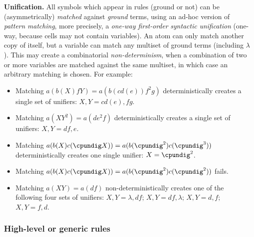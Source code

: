 \medskip
\noindent
\textbf{Unification.} 
All symbols which appear in rules (ground or not) can be (asymmetrically) \emph{matched} against \emph{ground} terms,
using an ad-hoc version of \emph{pattern matching}, 
more precisely, a \emph{one-way first-order syntactic unification} (one-way, because cells may not contain variables).
An atom can only match another copy of itself, but
a variable can match any multiset of ground terms (including $\lambda$).
This may create a combinatorial \emph{non-determinism}, 
when a combination of two or more variables are matched against the same multiset,
in which case an arbitrary matching is chosen. 
For example:
\begin{itemize}
\item Matching $a(b(X)fY) = a(b(cd(e))f^2g)$ deterministically creates a single set of unifiers:
$X, Y = cd(e), fg$.

\smallskip
\item Matching $a(XY^2) = a(de^2f)$ deterministically creates a single set of unifiers: 
$X, Y = df, e$.

\smallskip
\item Matching $a(b(X)c(\cpundig X)) = a(b(\cpundig^2)c(\cpundig^3))$ deterministically creates one single unifier: 
$X = \cpundig^2$.

\smallskip
\item Matching $a(b(X)c(\cpundig X)) = a(b(\cpundig^2)c(\cpundig^2))$ fails.

\smallskip
\item Matching $a(XY) = a(df)$ non-deterministically creates one of the following four sets of unifiers: 
$X, Y = \lambda, df$; $X, Y = df, \lambda$; $X, Y = d, f$; $X, Y = f, d$. 
\end{itemize}

\iffalse
\noindent
\textbf{Performance note.}
If the rules avoid any matching non-determinism, then
this proposal should not affect the performance of P~simulators running on existing machines.
Assuming that bags are already taken care of, e.g.~via hash-tables,
our proposed unification probably adds an almost linear factor.
Let us recall that, in similar contexts (no occurs check needed), 
Prolog unification algorithms can run in $O(n g(n))$ steps,
where $g$ is the inverse Ackermann function.
Our conjecture must be proven though, 
as the novel presence of multisets may affect the performance.
\fi


\subsubsection{High-level or generic rules}

